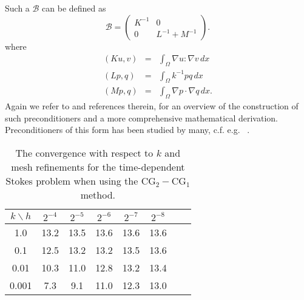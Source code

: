 Such a $\mathcal{B}$ can be defined as 
\[
\mathcal{B} 
= 
\begin{pmatrix} K^{-1} & 0 \\ 0 & L^{-1} + M^{-1} \end{pmatrix}.
\]
where 
\begin{eqnarray}
(K u, v) &=& \int_\Omega \nabla u: \nabla v \, dx \\ 
(L p, q) &=& \int_\Omega k^{-1} p q \, dx \\   
(M p, q) &=& \int_\Omega \nabla p \cdot  \nabla q \, dx .   
\end{eqnarray}
Again we refer to \cite{M-W-09} and references therein,  for an overview of the construction of such preconditioners and 
a more comprehensive mathematical derivation.  
Preconditioners of this form has been studied by many, c.f. e.g. ~\cite{C-C-88, E-S-W-text, M-W-04, M-W-09, T-99}. 

\begin{table}
\begin{center}
\begin{tabular}{|c|c||c|c|c|c|c|c|}
\hline
$k\backslash h$ & $2^{-4}$ & $2^{-5}$ & $2^{-6}$ & $2^{-7}$ & $2^{-8}$ \\ \hline\hline
1.0 & 13.2 & 13.5 & 13.6 & 13.6 & 13.6 \\ \hline 
0.1 & 12.5 & 13.2 & 13.2 & 13.5 & 13.6 \\ \hline 
0.01 & 10.3 & 11.0 & 12.8 & 13.2 & 13.4 \\ \hline 
0.001 & 7.3 & 9.1 & 11.0 & 12.3  & 13.0 \\ \hline 
\end{tabular}
\caption{The convergence with respect to $k$ and mesh refinements for the time-dependent Stokes problem 
when using the $\mathrm{CG}_2-\mathrm{CG}_1$ method.}\label{timestokes:ex} 
\end{center}
\end{table}

